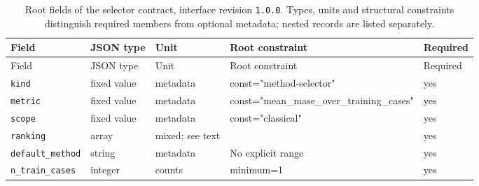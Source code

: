 \begingroup\small
\begin{longtable}{@{}p{}p{}p{}p{}p{}@{}}
\caption{Root fields of the selector contract, interface revision \texttt{1.0.0}. Types, units and structural constraints distinguish required members from optional metadata; nested records are listed separately.}\label{tab:contract-selector}\\
\toprule Field & JSON type & Unit & Root constraint & Required\\\midrule\endfirsthead
\toprule Field & JSON type & Unit & Root constraint & Required\\\midrule\endhead
\texttt{kind} & fixed value & metadata & const="method-selector" & yes\\
\texttt{metric} & fixed value & metadata & const="mean\_\allowbreak{}mase\_\allowbreak{}over\_\allowbreak{}training\_\allowbreak{}cases" & yes\\
\texttt{scope} & fixed value & metadata & const="classical" & yes\\
\texttt{ranking} & array & mixed; see text &  & yes\\
\texttt{default\_\allowbreak{}method} & string & metadata & No explicit range & yes\\
\texttt{n\_\allowbreak{}train\_\allowbreak{}cases} & integer & counts & minimum=1 & yes\\
\bottomrule
\end{longtable}
\endgroup
